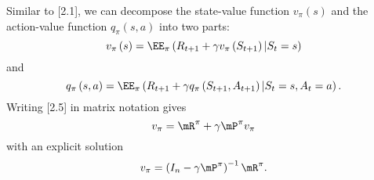 \documentclass[RL]{subfiles}
\begin{document}
    \np Similar to [2.1], we can decompose the state-value function $v_{\pi}\left( s \right)$ and the action-value function $q_{\pi}\left( s,a \right)$ into two parts:
    \begin{equation}
        v_{\pi}\left( s \right) = \EE_{\pi}\left( R_{t+1}+\gamma v_{\pi}\left( S_{t+1} \right) | S_t=s \right)
    \end{equation}
    and
    \begin{equation}
        q_{\pi}\left( s,a \right) = \EE_{\pi}\left( R_{t+1}+\gamma q_{\pi}\left( S_{t+1},A_{t+1} \right)|S_t=s,A_t=a \right).
    \end{equation}
    Writing [2.5] in matrix notation gives
    \begin{equation}
        v_{\pi} = \mR^{\pi} + \gamma\mP^{\pi}v_{\pi}
    \end{equation}
    with an explicit solution
    \begin{equation}
        v_{\pi} = \left( I_n-\gamma\mP^{\pi} \right)^{-1}\mR^{\pi}.
    \end{equation}





























    
    
    
    
    
    
    
    
\end{document}
